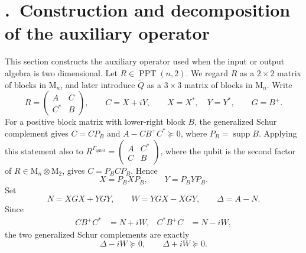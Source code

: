 \documentclass[aps,prl,reprint,superscriptaddress,nofootinbib]{revtex4-2}
\newcommand{\M}{\mathrm{M}}
\newcommand{\C}{\mathbb C}
\newcommand{\PPT}{\operatorname{PPT}}
\newcommand{\supp}{\operatorname{supp}}
\newcommand{\suppsection}[2]{%
 \refstepcounter{section}%
 \section*{\thesection.\ #1}%
 \label{sm:#2}}
\begin{document}
\suppsection{Construction and decomposition of the auxiliary operator}{sec:auxiliaryQ}

This section constructs the auxiliary operator used when the input or output
algebra is two dimensional.  Let \(R\in\PPT(n,2)\).  We regard \(R\) as a
\(2\times2\) matrix of blocks in \(\M_n\), and later introduce
\(\widetilde Q\) as a \(3\times3\) matrix of blocks in \(\M_n\).  Write
\begin{equation}
 R=\begin{pmatrix}A&C\\C^*&B\end{pmatrix},\qquad
 C=X+iY,\qquad X=X^*,\quad Y=Y^*,\qquad G=B^+.
\label{sm:eq:Rblocks}
\end{equation}
For a positive block matrix with lower-right block \(B\), the generalized
Schur complement gives \(C=CP_B\) and
\(A-CB^+C^*\succeq0\), where \(P_B=\supp B\).  Applying this statement
also to
\(R^{\Gamma_{\mathrm{qubit}}}
=\left(\begin{smallmatrix}A&C^*\\C&B\end{smallmatrix}\right)\),
where the qubit is the second factor of \(R\in\M_n\otimes\M_2\),
gives \(C=P_BCP_B\).  Hence
\begin{equation}
 X=P_BXP_B,\qquad Y=P_BYP_B.
\label{sm:eq:XYsupport}
\end{equation}
Set
\begin{equation}
 N=XGX+YGY,\qquad W=YGX-XGY,\qquad \Delta=A-N.
\label{sm:eq:auxiliaryblocks}
\end{equation}
Since
\begin{align}
 CB^+C^*&=N+iW,&C^*B^+C&=N-iW,
\end{align}
the two generalized Schur complements are exactly
\begin{equation}
 \Delta-iW\succeq0,\qquad \Delta+iW\succeq0.
\label{sm:eq:twoschur}
\end{equation}
\end{document}

